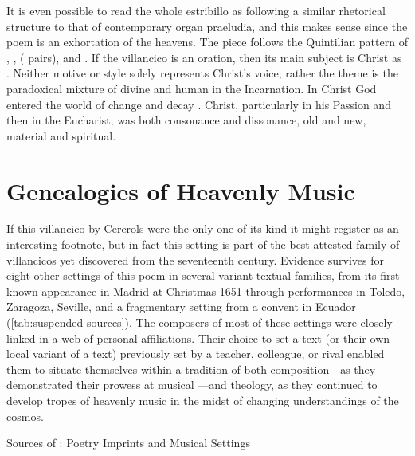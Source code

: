 It is even possible to read the whole estribillo as following a similar
rhetorical structure to that of contemporary organ praeludia, and this makes
sense since the poem is an exhortation of the heavens.%
    \Autocite{Jacobson:BuxtehudeRhetoric}
The piece follows the Quintilian pattern of , ,
 ( pairs), and .
If the villancico is an oration, then its main subject is Christ as .
Neither motive or style solely represents Christ's voice; rather the theme is
the paradoxical mixture of divine and human in the Incarnation.
In Christ God entered the world of change and decay .
Christ, particularly in his Passion and then in the Eucharist, was both
consonance and dissonance, old and new, material and spiritual.

\section{Genealogies of Heavenly Music}

If this villancico by Cererols were the only one of its kind it might register
as an interesting footnote, but in fact this setting is part of the
best-attested family of villancicos yet discovered from the seventeenth century.
Evidence survives for eight other settings of this poem in several variant
textual families, from its first known appearance in Madrid at Christmas 1651
through performances in Toledo, Zaragoza, Seville, and a fragmentary setting
from a convent in Ecuador (\cref{tab:suspended-sources}).
The composers of most of these settings were closely linked in a web of personal
affiliations.
Their choice to set a text (or their own local variant of a text) previously set
by a teacher, colleague, or rival enabled them to situate themselves within a
tradition of both composition---as they demonstrated their prowess at musical
---and theology, as they continued to develop tropes of
heavenly music in the midst of changing understandings of the cosmos.

{Sources of : Poetry Imprints and
Musical Settings}

